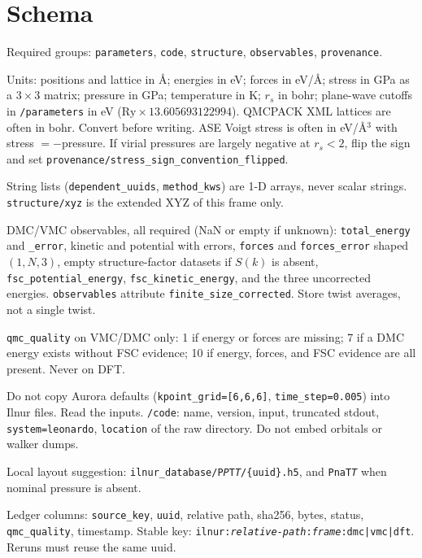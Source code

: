 \documentclass[11pt]{article}
\begin{document}
\section{Schema}
Required groups: \texttt{parameters}, \texttt{code}, \texttt{structure},
\texttt{observables}, \texttt{provenance}.

Units: positions and lattice in \AA; energies in eV; forces in eV/\AA;
stress in GPa as a $3\times 3$ matrix; pressure in GPa; temperature in K;
$r_s$ in bohr; plane-wave cutoffs in \texttt{/parameters} in eV
($\mathrm{Ry}\times 13.605693122994$).
QMCPACK XML lattices are often in bohr. Convert before writing.
ASE Voigt stress is often in eV/\AA$^3$ with stress $= -$pressure.
If virial pressures are largely negative at $r_s<2$, flip the sign and set
\texttt{provenance/stress\_sign\_convention\_flipped}.

String lists (\texttt{dependent\_uuids}, \texttt{method\_kws}) are 1-D arrays,
never scalar strings. \texttt{structure/xyz} is the extended XYZ of this frame
only.

DMC/VMC observables, all required (NaN or empty if unknown):
\texttt{total\_energy} and \texttt{\_error}, kinetic and potential with errors,
\texttt{forces} and \texttt{forces\_error} shaped $(1,N,3)$,
empty structure-factor datasets if $S(k)$ is absent,
\texttt{fsc\_potential\_energy}, \texttt{fsc\_kinetic\_energy},
and the three uncorrected energies.
\texttt{observables} attribute \texttt{finite\_size\_corrected}.
Store twist averages, not a single twist.

\texttt{qmc\_quality} on VMC/DMC only: 1 if energy or forces are missing;
7 if a DMC energy exists without FSC evidence; 10 if energy, forces, and FSC
evidence are all present. Never on DFT.

Do not copy Aurora defaults (\texttt{kpoint\_grid=[6,6,6]},
\texttt{time\_step=0.005}) into Ilnur files. Read the inputs.
\texttt{/code}: name, version, input, truncated stdout,
\texttt{system=leonardo}, \texttt{location} of the raw directory.
Do not embed orbitals or walker dumps.

Local layout suggestion:
\texttt{ilnur\_database/P\textit{P}T\textit{T}/\{uuid\}.h5},
and \texttt{PnaT\textit{T}} when nominal pressure is absent.

Ledger columns:
\texttt{source\_key}, \texttt{uuid}, relative path, sha256, bytes, status,
\texttt{qmc\_quality}, timestamp.
Stable key:
\texttt{ilnur:\textit{relative-path}:\textit{frame}:dmc|vmc|dft}.
Reruns must reuse the same uuid.
\end{document}
